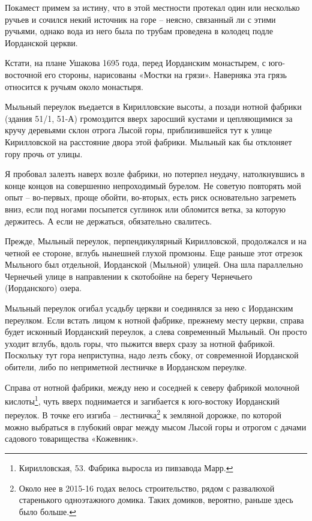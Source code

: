 Покамест примем за истину, что в этой местности протекал один или несколько ручьев и сочился некий источник на горе – неясно, связанный ли с этими ручьями, однако вода из него была по трубам проведена в колодец подле Иорданской церкви.

Кстати, на плане Ушакова 1695 года, перед Иорданским монастырем, с юго-восточной его стороны, нарисованы «Мостки на грязи». Наверняка эта грязь относится к ручьям около монастыря.

Мыльный переулок въедается в Кирилловские высоты, а позади нотной фабрики (здания 51/1, 51-А) громоздится вверх заросший кустами и цепляющимися за кручу деревьями склон отрога Лысой горы, приблизившейся тут к улице Кирилловской на расстояние двора этой фабрики. Мыльный как бы отклоняет гору прочь от улицы.

Я пробовал залезть наверх возле фабрики, но потерпел неудачу, натолкнувшись в конце концов на совершенно непроходимый бурелом. Не советую повторять мой опыт – во-первых, проще обойти, во-вторых, есть риск основательно загреметь вниз, если под ногами посыпется суглинок или обломится ветка, за которую держитесь. А если не держаться, обязательно свалитесь.

Прежде, Мыльный переулок, перпенди\-кулярный Ки\-рилловской, продолжался и на четной ее стороне, вглубь нынешней глухой промзоны. Еще раньше этот отрезок Мыльного был отдельной, Иорданской (Мыльной) улицей. Она шла параллельно Чернечьей улице в направлении к скотобойне на берегу Чернечьего (Иорданского) озера.

Мыльный переулок огибал усадьбу церкви и  соединялся за нею с Иорданским переулком. Если встать лицом к нотной фабрике, прежнему месту церкви, справа будет исконный Иорданский переулок, а слева современный Мыльный. Он просто уходит вглубь, вдоль горы, что пыжится вверх сразу за нотной фабрикой. Поскольку тут гора неприступна, надо лезть сбоку, от современной Иорданской обители, либо по неприметной лестничке в Иорданском переулке.

Справа от нотной фабрики, между нею и соседней к северу фабрикой молочной кислоты\footnote{Кирилловская, 53. Фабрика выросла из пивзавода Марр.}, чуть вверх поднимается и загибается к юго-востоку Иорданский переулок. В точке его изгиба – лестничка\footnote{Около нее в 2015-16 годах велось строительство, рядом с развалюхой старенького одноэтажного домика. Таких домиков, вероятно, раньше здесь было больше.} к земляной дорожке, по которой можно выбраться в глубокий овраг между мысом Лысой горы и отрогом с дачами садового товарищества «Кожевник». 


